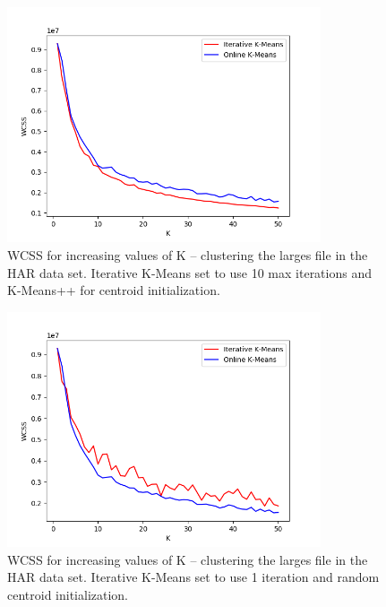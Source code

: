 \documentclass{l4proj}
\begin{document}
\begin{appendices}
\begin{figure}[H]
	\centering
    \includegraphics[width=0.825\textwidth]{images/result8}
    \caption{WCSS for increasing values of K -- clustering the larges file in the HAR data set. Iterative K-Means set to use 10 max iterations and K-Means++ for centroid initialization. } 
    \label{fig:res8}
\end{figure}

\begin{figure}[H]
	\centering
    \includegraphics[width=0.825\textwidth]{images/result9}
    \caption{WCSS for increasing values of K -- clustering the larges file in the HAR data set. Iterative K-Means set to use 1 iteration and random centroid initialization. } 
    \label{fig:res9}
\end{figure}


\end{appendices}
\end{document}
